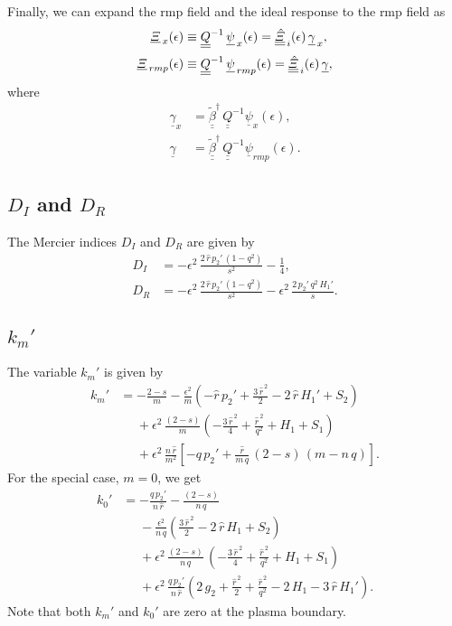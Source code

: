 \documentclass[12pt,prb,aps,notitlepage]{revtex4-1}
\begin{document}
Finally, we can expand the rmp field and the ideal response to the rmp field as
\begin{align}
\underline{\mit\Xi}_{\,x}(\epsilon) &\equiv \underline{\underline{Q}}^{-1}\,\underline{\psi}_{\,x}(\epsilon)= \underline{\underline{\hat{\mit\Xi}}}_{\,i}(\epsilon)\,\underline{\gamma}_{\,x},\\[0.5ex]
\underline{\mit\Xi}_{\,rmp}(\epsilon) &\equiv \underline{\underline{Q}}^{-1}\,\underline{\psi}_{\,rmp}(\epsilon) =\underline{\underline{\hat{\mit\Xi}}}_{\,i}(\epsilon)\,\underline{\gamma},
\end{align}
where 
\begin{align}
\underline{\gamma}_x&= \underline{\underline{\tilde{\beta}}}^\dag\,\underline{\underline{Q}}^{-1}\underline{\psi}_x(\epsilon),\\[0.5ex]
\underline{\gamma}&= \underline{\underline{\tilde{\beta}}}^\dag\,\underline{\underline{Q}}^{-1}\underline{\psi}_{rmp}(\epsilon).
\end{align}

\subsection{$D_I$ and $D_R$}
The Mercier indices $D_I$ and $D_R$ are given by
\begin{align}
D_I&= - \epsilon^2\,\frac{2\,\hat{r}\,p_2'\,(1-q^2)}{s^2} -\frac{1}{4},\\[0.5ex]
D_R &= - \epsilon^2\,\frac{2\,\hat{r}\,p_2'\,(1-q^2)}{s^2} -\epsilon^2\,\frac{2\,p_2'\,q^2\,H_1'}{s}.
\end{align}

\subsection{$k_m'$}
The variable $k_m'$ is given by 
\begin{align}
k_m'&= -\frac{2-s}{m}
-\frac{\epsilon^2}{m}\left(-\hat{r}\,p_2'+
\frac{3\,\hat{r}^{\,2}}{2}-2\,\hat{r}\,H_1' +S_2\right)\nonumber\\[0.5ex]
&\phantom{=}
+\epsilon^2\,\frac{(2-s)}{m}\left(-\frac{3\,\hat{r}^{\,2}}{4} +\frac{\hat{r}^{\,2}}{q^2}+H_1+S_1\right)\nonumber\\[0.5ex]
&\phantom{=}
+\epsilon^2\,\frac{n\,\hat{r}}{m^2}\left[-q\,p_2' + \frac{\hat{r}}{m\,q}\,(2-s)\,(m-n\,q)\right].
\end{align}
For the special case, $m=0$, we get
\begin{align}
k_0' &= - \frac{q\,p_2'}{n\,\hat{r}} - \frac{(2-s)}{n\,q} 
\nonumber\\[0.5ex]
&\phantom{=}-\frac{\epsilon^2}{n\,q}\left(
\frac{3\,\hat{r}^{\,2}}{2}-2\,\hat{r}\,H_1+S_2\right)\nonumber\\[0.5ex]
&\phantom{=}
+\epsilon^2\,\frac{(2-s)}{n\,q}\,\left(-\frac{3\,\hat{r}^{\,2}}{4} +\frac{\hat{r}^{\,2}}{q^2}+H_1 +S_1\right)\nonumber\\[0.5ex]
&\phantom{=}
+\epsilon^2\,\frac{q\,p_2'}{n\,\hat{r}}\left(2\,g_2+\frac{\hat{r}^{\,2}}{2}+\frac{\hat{r}^{\,2}}{q^2}-2\,H_1-3\,\hat{r}\,H_1'\right).
\end{align}
Note that both $k_m'$ and $k_0'$ are zero at the plasma boundary. 
\end{document}
